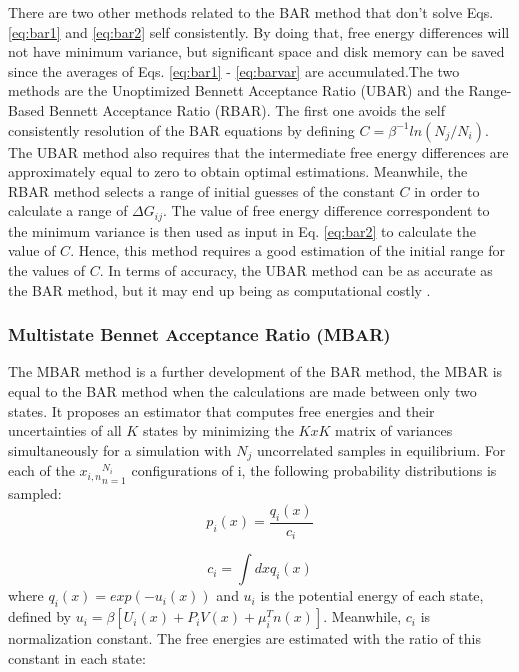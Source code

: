 There are two other methods related to the BAR method that don't solve Eqs. \eqref{eq:bar1} and \eqref{eq:bar2} self consistently. By doing that, free energy differences will not have minimum variance, but significant space and disk memory can be saved since the averages of Eqs. \eqref{eq:bar1} - \eqref{eq:barvar} are accumulated.The two methods are the Unoptimized Bennett Acceptance Ratio (UBAR) and the Range-Based Bennett Acceptance Ratio (RBAR). The first one avoids the self consistently resolution of the BAR equations by defining $C=\beta^{-1}ln(N_{j}/N_{i})$. The UBAR method also requires that the intermediate free energy differences are approximately equal to zero to obtain optimal estimations. Meanwhile, the RBAR method selects a range of initial guesses of the constant $C$ in order to calculate a range  of $\Delta G_{ij}$. The value of free energy difference correspondent to the minimum variance is then used as input in Eq. \eqref{eq:bar2} to calculate the value of $C$. Hence, this method requires a good estimation of the initial range for the values of $C$. In terms of accuracy, the UBAR method can be as accurate as the BAR method, but it may end up being as computational costly \cite{bareva}.  

\subsubsection{Multistate Bennet Acceptance Ratio (MBAR)}\label{mbar}

The MBAR method \cite{mbar} is a further development of the BAR method, the MBAR is equal to the BAR method when the calculations are made between only two states. It proposes an estimator that computes free energies and their uncertainties of all $K$ states  by minimizing the $KxK$ matrix of variances simultaneously for a simulation with $N_{j}$ uncorrelated samples in equilibrium. For each of the ${x_{i,n}}_{n=1}^{N_{i}}$ configurations of i, the following probability distributions is sampled:
\begin{equation}
p_{i}(x) = \frac{q_{i}(x)}{c_{i}}
\end{equation}

\begin{equation}
c_{i} = \int dx q_{i}(x)
\end{equation}
where $q_{i}(x)=exp(-u_{i}(x))$ and $u_{i}$ is the potential energy of each state, defined by $u_{i}= \beta [U_{i}(x)+P_{i}V(x) + \mu _{i}^{T}n(x)]$. Meanwhile, $c_{i}$ is normalization constant.  The free energies are estimated with the ratio of this constant in each state:

